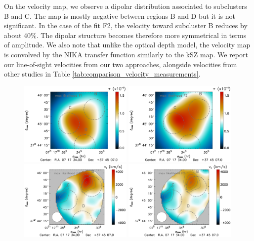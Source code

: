\documentclass[twocolumn,traditabstract]{aa}
\begin{document}
On the velocity map, we observe a dipolar distribution associated to subclusters B and C. The map is mostly negative between regions B and D but it is not significant. In the case of the fit F2, the velocity toward subcluster B reduces by about 40\%. The dipolar structure becomes therefore more symmetrical in terms of amplitude. We also note that unlike the optical depth model, the velocity map is convolved by the NIKA transfer function similarly to the kSZ map. We report our line-of-sight velocities from our two approaches, alongside velocities from other studies in Table \ref{tab:comparison_velocity_measurements}.
\begin{figure}[h]
\centering
\includegraphics[width=0.49\textwidth]{Figure/MACSJ0717_tau_map_F1.pdf}
\includegraphics[width=0.49\textwidth]{Figure/MACSJ0717_tau_map_F2.pdf}
\includegraphics[width=0.49\textwidth]{Figure/MACSJ0717_vz_map_F1.pdf}
\includegraphics[width=0.49\textwidth]{Figure/MACSJ0717_vz_map_F2.pdf}

\end{figure}
\end{document}
